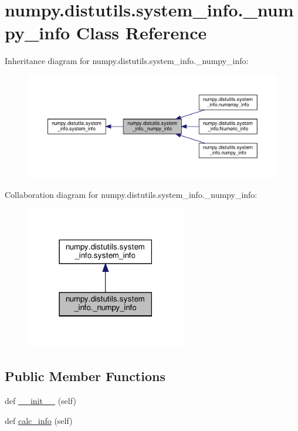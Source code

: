 \hypertarget{classnumpy_1_1distutils_1_1system__info_1_1__numpy__info}{}\section{numpy.\+distutils.\+system\+\_\+info.\+\_\+numpy\+\_\+info Class Reference}
\label{classnumpy_1_1distutils_1_1system__info_1_1__numpy__info}


Inheritance diagram for numpy.\+distutils.\+system\+\_\+info.\+\_\+numpy\+\_\+info\+:
\nopagebreak
\begin{figure}[H]
\begin{center}
\leavevmode
\includegraphics[width=350pt]{classnumpy_1_1distutils_1_1system__info_1_1__numpy__info__inherit__graph}
\end{center}
\end{figure}


Collaboration diagram for numpy.\+distutils.\+system\+\_\+info.\+\_\+numpy\+\_\+info\+:
\nopagebreak
\begin{figure}[H]
\begin{center}
\leavevmode
\includegraphics[width=198pt]{classnumpy_1_1distutils_1_1system__info_1_1__numpy__info__coll__graph}
\end{center}
\end{figure}
\subsection*{Public Member Functions}
\begin{DoxyCompactItemize}
\item 
def \hyperlink{classnumpy_1_1distutils_1_1system__info_1_1__numpy__info_a3d77b52b84e51d0e0c7730d45914dcaf}{\+\_\+\+\_\+init\+\_\+\+\_\+} (self)
\item 
def \hyperlink{classnumpy_1_1distutils_1_1system__info_1_1__numpy__info_a7a0ebb3a4c0d63f690f63371d05f80bd}{calc\+\_\+info} (self)
\end{DoxyCompactItemize}
